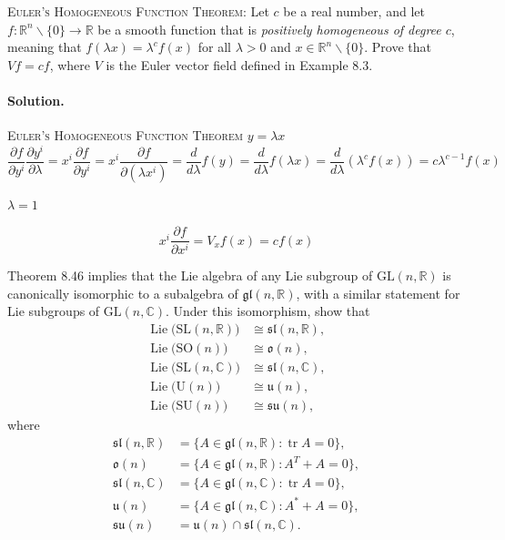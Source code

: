 \hrulefill

\begin{exercise}
\textsc{Euler's Homogeneous Function Theorem}: Let $c$ be a real number, and let $f\colon\mathbb{R}^n\smallsetminus\{0\}\to\mathbb{R}$ be a smooth function that is \emph{positively homogeneous of degree $c$}, meaning that $f(\lambda x)=\lambda^c f(x)$ for all $\lambda>0$ and $x\in\mathbb{R}^n\smallsetminus\{0\}$. Prove that $Vf=cf$, where $V$ is the Euler vector field defined in Example 8.3.
\end{exercise}
\paragraph{Solution.} \textsc{Euler's Homogeneous Function Theorem} 
$y = \lambda x$
\[
\frac{ \partial f}{ \partial y^i } \frac{ \partial y^i}{ \partial \lambda} = x^i \frac{ \partial f}{ \partial y^i} = x^i \frac{ \partial f}{ \partial ( \lambda x^i)} = \frac{d}{d\lambda} f(y) = \frac{d}{d\lambda} f(\lambda x) = \frac{d}{d\lambda} ( \lambda^c f(x)) = c \lambda^{c-1} f(x)
\]

$\lambda = 1$

\[
\boxed{ x^i \frac{ \partial f}{ \partial x^i } = V_x f(x) = cf(x) }
\]


\hrulefill




\begin{exercise}
Theorem 8.46 implies that the Lie algebra of any Lie subgroup of $\mathrm{GL}(n,\mathbb{R})$ is canonically isomorphic to a subalgebra of $\mathfrak{gl}(n,\mathbb{R})$, with a similar statement for Lie subgroups of $\mathrm{GL}(n,\mathbb{C})$. Under this isomorphism, show that
\begin{align*}
\operatorname{Lie}\bigl(\mathrm{SL}(n,\mathbb{R})\bigr)&\cong\mathfrak{sl}(n,\mathbb{R}),\\
\operatorname{Lie}\bigl(\mathrm{SO}(n)\bigr)&\cong\mathfrak{o}(n),\\
\operatorname{Lie}\bigl(\mathrm{SL}(n,\mathbb{C})\bigr)&\cong\mathfrak{sl}(n,\mathbb{C}),\\
\operatorname{Lie}\bigl(\mathrm{U}(n)\bigr)&\cong\mathfrak{u}(n),\\
\operatorname{Lie}\bigl(\mathrm{SU}(n)\bigr)&\cong\mathfrak{su}(n),
\end{align*}
where
\begin{align*}
\mathfrak{sl}(n,\mathbb{R})&=\{A\in\mathfrak{gl}(n,\mathbb{R}):\operatorname{tr}A=0\},\\
\mathfrak{o}(n)&=\{A\in\mathfrak{gl}(n,\mathbb{R}):A^T+A=0\},\\
\mathfrak{sl}(n,\mathbb{C})&=\{A\in\mathfrak{gl}(n,\mathbb{C}):\operatorname{tr}A=0\},\\
\mathfrak{u}(n)&=\{A\in\mathfrak{gl}(n,\mathbb{C}):A^*+A=0\},\\
\mathfrak{su}(n)&=\mathfrak{u}(n)\cap\mathfrak{sl}(n,\mathbb{C}).
\end{align*}
\end{exercise}
